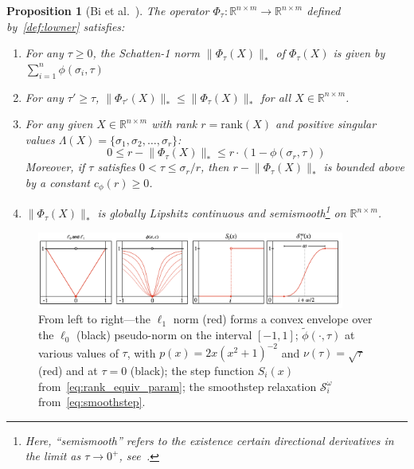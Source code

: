 \documentclass[10pt]{article}
\numberwithin{equation}{section}
\newcommand{\+}{%
	\raisebox{0.18ex}{\scaleobj{0.55}{+}}
}
\newtheorem{proposition}{Proposition}
\theoremstyle{definition}
\newtheorem{remark}{Remark}
\theoremstyle{definition}
\begin{document}
\begin{proposition}[Bi et al.~\cite{bi2013approximation}] The operator $\Phi_\tau: \mathbb{R}^{n \times m} \to \mathbb{R}^{n \times m}$ defined by~\eqref{def:lowner} satisfies: 
	\begin{enumerate}
		\item For any $\tau \geq 0$, the Schatten-1 norm $\lVert \Phi_\tau(X) \rVert_\ast$ of  $\Phi_\tau(X)$ is given by $\sum\limits_{i=1}^n \phi(\sigma_i, \tau)$
		\item For any $\tau' \geq \tau$, $\lVert \Phi_{\tau'}(X) \rVert_\ast \leq \lVert \Phi_{\tau}(X) \rVert_\ast$ for all $X \in \mathbb{R}^{n \times m}$.
		\item For any given $X \in \mathbb{R}^{n \times m}$ with rank $r = \mathrm{rank}(X)$ and positive singular values $\Lambda(X) = \{\sigma_1, \sigma_2, \dots, \sigma_r\}$:
		$$ 0 \leq r - \lVert \Phi_\tau(X) \rVert_\ast \leq r\cdot (1 - \phi(\sigma_r, \tau))$$
		Moreover, if $\tau$ satisfies $0 < \tau \leq \sigma_r / r$, then $r - \lVert \Phi_\tau(X) \rVert_\ast$ is bounded above by a constant $c_\phi(r) \geq 0$. %
		\item $\lVert \Phi_\tau(X) \rVert_\ast$ is globally Lipshitz continuous and semismooth\footnote{Here, ``semismooth'' refers to the existence certain directional derivatives in the limit as $\tau \to 0^+$, see~\cite{bhatia2013matrix, bi2013approximation}.} on $\mathbb{R}^{n \times m}$.
	\end{enumerate}
\end{proposition}
\begin{figure}
\centering
	\includegraphics[width=0.90\textwidth]{cont_relax}
	\caption{From left to right---the $\ell_1$ norm (red) forms a convex envelope over the $\ell_0$ (black) pseudo-norm on the interval $[-1, 1]$; 
	$\tilde{\phi}(\cdot, \tau)$ at various values of $\tau$, with $p(x) = 2x (x^2 + 1)^{-2}$ and $\nu(\tau) = \sqrt{\tau}$ (red) and at $\tau = 0$ (black); 
	the step function $S_i(x)$ from~\eqref{eq:rank_equiv_param}; 
	the smoothstep relaxation $\mathcal{S}_i^{\omega}$ from~\eqref{eq:smoothstep}.
	}
	\label{fig:smoothstep}
\end{figure}
\end{document}
